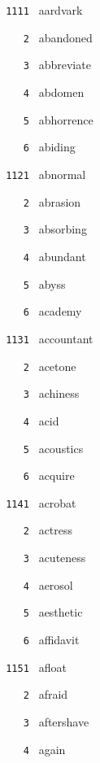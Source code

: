 \documentclass[11pt]{article}
\begin{document}
\begin{multicols}{6}
\footnotesize
\noindent \texttt{ 1111 } aardvark  \par
\noindent \texttt{ \ \ \ 2 } abandoned  \par
\noindent \texttt{ \ \ \ 3 } abbreviate  \par
\noindent \texttt{ \ \ \ 4 } abdomen  \par
\noindent \texttt{ \ \ \ 5 } abhorrence  \par
\noindent \texttt{ \ \ \ 6 } abiding  \par
\vspace{3mm}
\noindent \texttt{ 1121 } abnormal  \par
\noindent \texttt{ \ \ \ 2 } abrasion  \par
\noindent \texttt{ \ \ \ 3 } absorbing  \par
\noindent \texttt{ \ \ \ 4 } abundant  \par
\noindent \texttt{ \ \ \ 5 } abyss  \par
\noindent \texttt{ \ \ \ 6 } academy  \par
\vspace{3mm}
\noindent \texttt{ 1131 } accountant  \par
\noindent \texttt{ \ \ \ 2 } acetone  \par
\noindent \texttt{ \ \ \ 3 } achiness  \par
\noindent \texttt{ \ \ \ 4 } acid  \par
\noindent \texttt{ \ \ \ 5 } acoustics  \par
\noindent \texttt{ \ \ \ 6 } acquire  \par
\vspace{3mm}
\noindent \texttt{ 1141 } acrobat  \par
\noindent \texttt{ \ \ \ 2 } actress  \par
\noindent \texttt{ \ \ \ 3 } acuteness  \par
\noindent \texttt{ \ \ \ 4 } aerosol  \par
\noindent \texttt{ \ \ \ 5 } aesthetic  \par
\noindent \texttt{ \ \ \ 6 } affidavit  \par
\vspace{3mm}
\noindent \texttt{ 1151 } afloat  \par
\noindent \texttt{ \ \ \ 2 } afraid  \par
\noindent \texttt{ \ \ \ 3 } aftershave  \par
\noindent \texttt{ \ \ \ 4 } again  \par

\end{multicols}
\end{document}
